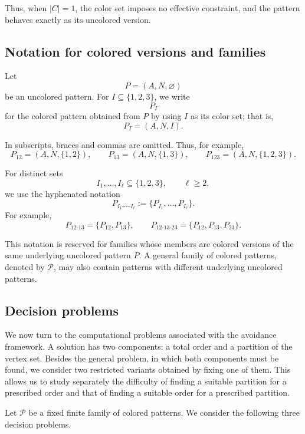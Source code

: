 \documentclass[12pt]{article}
\theoremstyle{plain}
\theoremstyle{definition}
\theoremstyle{remark}
\theoremstyle{definition}
\begin{document}
Thus, when \(|C|=1\), the color set imposes no effective constraint, and the
pattern behaves exactly as its uncolored version.


\subsection{Notation for colored versions and families}
\label{subsec:colored-notation}

Let
\[
P=(A,N,\varnothing)
\]
be an uncolored pattern. For \(I\subseteq\{1,2,3\}\), we write
\[
P_I
\]
for the colored pattern obtained from \(P\) by using \(I\) as its color set;
that is,
\[
P_I=(A,N,I).
\]

In subscripts, braces and commas are omitted. Thus, for example,
\[
P_{12}=(A,N,\{1,2\}),
\qquad
P_{13}=(A,N,\{1,3\}),
\qquad
P_{123}=(A,N,\{1,2,3\}).
\]

For distinct sets
\[
I_1,\dots,I_\ell\subseteq\{1,2,3\},
\qquad \ell\ge2,
\]
we use the hyphenated notation
\[
P_{I_1\text{-}\cdots\text{-}I_\ell}
:=
\{P_{I_1},\dots,P_{I_\ell}\}.
\]
For example,
\[
P_{12\text{-}13}
=
\{P_{12},P_{13}\},
\qquad
P_{12\text{-}13\text{-}23}
=
\{P_{12},P_{13},P_{23}\}.
\]

This notation is reserved for families whose members are colored versions
of the same underlying uncolored pattern \(P\). A general family of colored
patterns, denoted by \(\mathcal P\), may also contain patterns with different
underlying uncolored patterns.






\subsection{Decision problems}
\label{subsec:decision-problems}


We now turn to the computational problems associated with the avoidance
framework. A solution has two components: a total order and a partition of
the vertex set. Besides the general problem, in which both components must
be found, we consider two restricted variants obtained by fixing one of
them. This allows us to study separately the difficulty of finding a
suitable partition for a prescribed order and that of finding a suitable
order for a prescribed partition.

Let \(\mathcal P\) be a fixed finite family of colored patterns. We consider
the following three decision problems.
 
\end{document}
